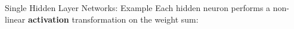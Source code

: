 
\begin{frame} {Single Hidden Layer Networks: Example}
Each hidden neuron performs a non-linear \textbf{activation} transformation on the weight sum:
\begin{figure}
\centering
{}
\end{figure}
\end{frame}

